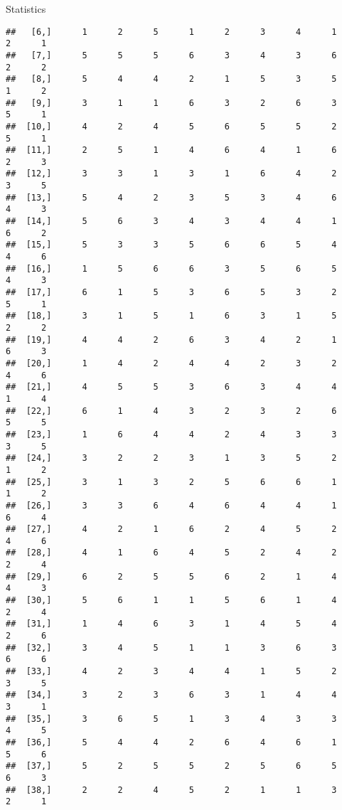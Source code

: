 \documentclass[
  ignorenonframetext,
]{beamer}
\begin{document}
\begin{frame}[fragile]{Statistics}
\begin{verbatim}
##   [6,]      1      2      5      1      2      3      4      1      2      1
##   [7,]      5      5      5      6      3      4      3      6      2      2
##   [8,]      5      4      4      2      1      5      3      5      1      2
##   [9,]      3      1      1      6      3      2      6      3      5      1
##  [10,]      4      2      4      5      6      5      5      2      5      1
##  [11,]      2      5      1      4      6      4      1      6      2      3
##  [12,]      3      3      1      3      1      6      4      2      3      5
##  [13,]      5      4      2      3      5      3      4      6      4      3
##  [14,]      5      6      3      4      3      4      4      1      6      2
##  [15,]      5      3      3      5      6      6      5      4      4      6
##  [16,]      1      5      6      6      3      5      6      5      4      3
##  [17,]      6      1      5      3      6      5      3      2      5      1
##  [18,]      3      1      5      1      6      3      1      5      2      2
##  [19,]      4      4      2      6      3      4      2      1      6      3
##  [20,]      1      4      2      4      4      2      3      2      4      6
##  [21,]      4      5      5      3      6      3      4      4      1      4
##  [22,]      6      1      4      3      2      3      2      6      5      5
##  [23,]      1      6      4      4      2      4      3      3      3      5
##  [24,]      3      2      2      3      1      3      5      2      1      2
##  [25,]      3      1      3      2      5      6      6      1      1      2
##  [26,]      3      3      6      4      6      4      4      1      6      4
##  [27,]      4      2      1      6      2      4      5      2      4      6
##  [28,]      4      1      6      4      5      2      4      2      2      4
##  [29,]      6      2      5      5      6      2      1      4      4      3
##  [30,]      5      6      1      1      5      6      1      4      2      4
##  [31,]      1      4      6      3      1      4      5      4      2      6
##  [32,]      3      4      5      1      1      3      6      3      6      6
##  [33,]      4      2      3      4      4      1      5      2      3      5
##  [34,]      3      2      3      6      3      1      4      4      3      1
##  [35,]      3      6      5      1      3      4      3      3      4      5
##  [36,]      5      4      4      2      6      4      6      1      5      6
##  [37,]      5      2      5      5      2      5      6      5      6      3
##  [38,]      2      2      4      5      2      1      1      3      2      1

\end{verbatim}
\end{frame}
\end{document}
